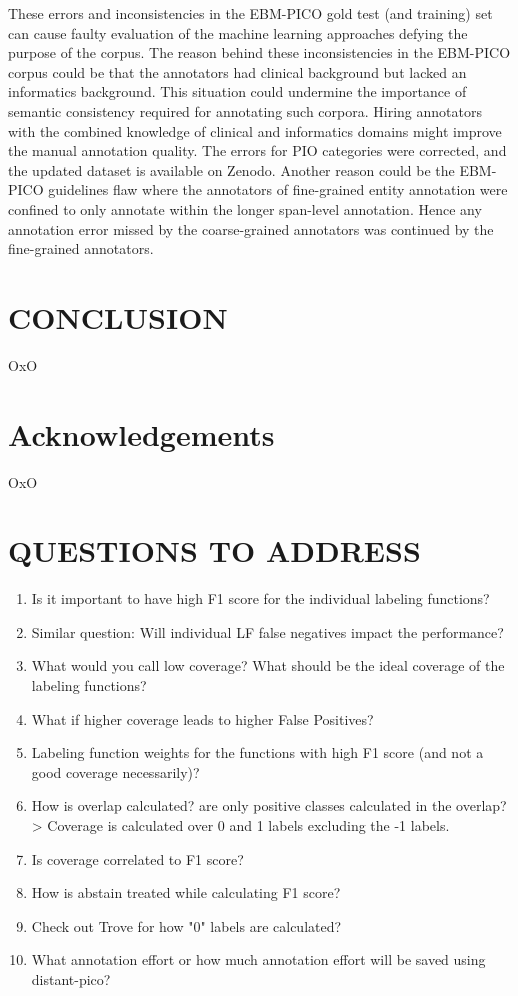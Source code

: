 \documentclass[10.7pt,]{article}
\begin{document}
These errors and inconsistencies in the EBM-PICO gold test (and training) set can cause faulty evaluation of the machine learning approaches defying the purpose of the corpus.
The reason behind these inconsistencies in the EBM-PICO corpus could be that the annotators had clinical background but lacked an informatics background.
This situation could undermine the importance of semantic consistency required for annotating such corpora.
Hiring annotators with the combined knowledge of clinical and informatics domains might improve the manual annotation quality.
The errors for PIO categories were corrected, and the updated dataset is available on Zenodo.
Another reason could be the EBM-PICO guidelines flaw where the annotators of fine-grained entity annotation were confined to only annotate within the longer span-level annotation.
Hence any annotation error missed by the coarse-grained annotators was continued by the fine-grained annotators.
%
%
%
\section{CONCLUSION}\label{conclusion}
%
OxO
%
%
%
\section{Acknowledgements}\label{acknowledgements}
%
OxO
%
%
%
\section{QUESTIONS TO ADDRESS}\label{ques}
%

\begin{enumerate}
    \item Is it important to have high F1 score for the individual labeling functions?
    \item Similar question: Will individual LF false negatives impact the performance?
    \item What would you call low coverage? What should be the ideal coverage of the labeling functions?
    \item What if higher coverage leads to higher False Positives?
    \item Labeling function weights for the functions with high F1 score (and not a good coverage necessarily)?
    \item How is overlap calculated? are only positive classes calculated in the overlap? > Coverage is calculated over 0 and 1 labels excluding the -1 labels.
    \item Is coverage correlated to F1 score?
    \item How is abstain treated while calculating F1 score?
    \item Check out Trove for how "0" labels are calculated?
    \item What annotation effort or how much annotation effort will be saved using distant-pico?
\end{enumerate}
\end{document}
